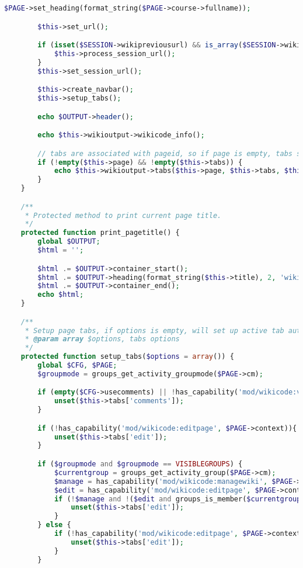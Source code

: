 \begin{lstlisting}[language=PHP]
        $PAGE->set_heading(format_string($PAGE->course->fullname));

        $this->set_url();

        if (isset($SESSION->wikipreviousurl) && is_array($SESSION->wikipreviousurl)) {
            $this->process_session_url();
        }
        $this->set_session_url();

        $this->create_navbar();
        $this->setup_tabs();

        echo $OUTPUT->header();

        echo $this->wikioutput->wikicode_info();

        // tabs are associated with pageid, so if page is empty, tabs should be disabled
        if (!empty($this->page) && !empty($this->tabs)) {
            echo $this->wikioutput->tabs($this->page, $this->tabs, $this->tabs_options);
        }
    }

    /**
     * Protected method to print current page title.
     */
    protected function print_pagetitle() {
        global $OUTPUT;
        $html = '';

        $html .= $OUTPUT->container_start();
        $html .= $OUTPUT->heading(format_string($this->title), 2, 'wikicode_headingtitle');
        $html .= $OUTPUT->container_end();
        echo $html;
    }

    /**
     * Setup page tabs, if options is empty, will set up active tab automatically
     * @param array $options, tabs options
     */
    protected function setup_tabs($options = array()) {
        global $CFG, $PAGE;
        $groupmode = groups_get_activity_groupmode($PAGE->cm);

        if (empty($CFG->usecomments) || !has_capability('mod/wikicode:viewcomment', $PAGE->context)){
            unset($this->tabs['comments']);
        }

        if (!has_capability('mod/wikicode:editpage', $PAGE->context)){
            unset($this->tabs['edit']);
        }

        if ($groupmode and $groupmode == VISIBLEGROUPS) {
            $currentgroup = groups_get_activity_group($PAGE->cm);
            $manage = has_capability('mod/wikicode:managewiki', $PAGE->cm->context);
            $edit = has_capability('mod/wikicode:editpage', $PAGE->context);
            if (!$manage and !($edit and groups_is_member($currentgroup))) {
                unset($this->tabs['edit']);
            }
        } else {
            if (!has_capability('mod/wikicode:editpage', $PAGE->context)) {
                unset($this->tabs['edit']);
            }
        }



\end{lstlisting}

